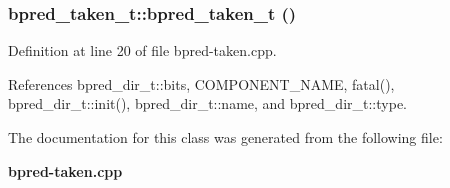 \subsubsection[{bpred\_\-taken\_\-t}]{\setlength{\rightskip}{0pt plus 5cm}bpred\_\-taken\_\-t::bpred\_\-taken\_\-t ()\hspace{0.3cm}{\tt  [inline]}}\label{classbpred__taken__t_73d4a924c1feb9fd4002b270aad7ab24}




Definition at line 20 of file bpred-taken.cpp.

References bpred\_\-dir\_\-t::bits, COMPONENT\_\-NAME, fatal(), bpred\_\-dir\_\-t::init(), bpred\_\-dir\_\-t::name, and bpred\_\-dir\_\-t::type.

The documentation for this class was generated from the following file:\begin{CompactItemize}
\item 
{\bf bpred-taken.cpp}\end{CompactItemize}
